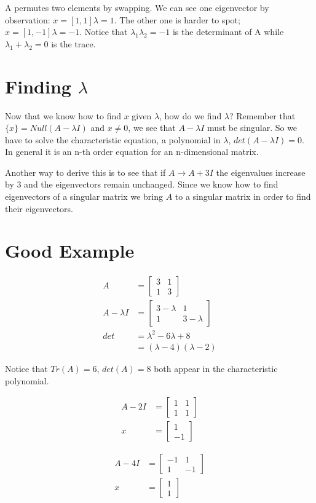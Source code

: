 \documentclass{article}
\begin{document}
A permutes two elements by swapping. We can see one eigenvector by observation: $x = [1,1] \lambda = 1$. The other one is harder to spot; $x = [1,-1] \lambda = -1$. Notice that $\lambda_1 \lambda_2 = -1$ is the determinant of A while $\lambda_1 + \lambda_2 = 0$ is the trace.

\section{Finding $\lambda$}
Now that we know how to find $x$ given $\lambda$, how do we find $\lambda$? Remember that $\{x\} = Null(A-\lambda I)$ and $x \neq 0$, we see that $A-\lambda I$ must be singular. So we have to solve the characteristic equation, a polynomial in $\lambda$, $det(A-\lambda I) = 0$. In general it is an n-th order equation for an n-dimensional matrix.

Another way to derive this is to see that if $A \rightarrow A + 3I$ the eigenvalues increase by 3 and the eigenvectors remain unchanged. Since we know how to find eigenvectors of a singular matrix we bring $A$ to a singular matrix in order to find their eigenvectors.

\section{Good Example}

\begin{align}
A &=
\begin{bmatrix} 
3 & 1 \\ 
1 & 3
\end{bmatrix} \\
A - \lambda I &=
\begin{bmatrix} 
3-\lambda & 1 \\ 
1 & 3-\lambda
\end{bmatrix} \\
det &= \lambda^2 - 6\lambda + 8 \\
&= (\lambda-4)(\lambda-2)
\end{align}

Notice that $Tr(A) = 6$, $det(A) = 8$ both appear in the characteristic polynomial.

\begin{align}
A - 2I &=
\begin{bmatrix} 
1 & 1 \\ 
1 & 1
\end{bmatrix} \\
x &= 
\begin{bmatrix} 
1\\ 
-1
\end{bmatrix} 
\end{align}

\begin{align}
A - 4I &=
\begin{bmatrix} 
-1 & 1 \\ 
1 & -1
\end{bmatrix} \\
x &= 
\begin{bmatrix} 
1\\ 
1
\end{bmatrix} 
\end{align}
\end{document}
